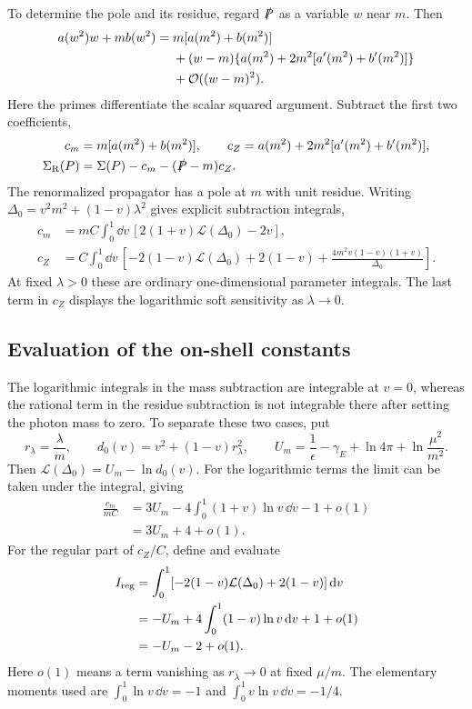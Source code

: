 To determine the pole and its residue, regard $\slashed P$ as a
variable $w$ near $m$. Then
\begin{equation}
 \begin{aligned}
 a(w^2)w+mb(w^2)={}&m[a(m^2)+b(m^2)]\\
 &+(w-m)\{a(m^2)+2m^2[a'(m^2)+b'(m^2)]\}\\
 &+\mathcal{O}((w-m)^2).
 \end{aligned}
\end{equation}
Here the primes differentiate the scalar squared argument. Subtract
the first two coefficients,
\begin{align}
 c_m&=m[a(m^2)+b(m^2)],\qquad
 c_Z=a(m^2)+2m^2[a'(m^2)+b'(m^2)],\\
 \Sigma_{\mathrm R}(P)&=\Sigma(P)-c_m-(\slashed P-m)c_Z.
\end{align}
The renormalized propagator has a pole at $m$ with unit residue.
Writing $\Delta_0=v^2m^2+(1-v)\lambda^2$ gives explicit subtraction
integrals,
\begin{align}
 c_m&=mC\int_0^1\dd v\,[2(1+v)\mathcal L(\Delta_0)-2v],\\
 c_Z&=C\int_0^1\dd v\,
 \left[-2(1-v)\mathcal L(\Delta_0)+2(1-v)
       +\frac{4m^2v(1-v)(1+v)}{\Delta_0}\right].
 \label{eq:comp-supp-cz}
\end{align}
At fixed $\lambda>0$ these are ordinary one-dimensional parameter
integrals. The last term in $c_Z$ displays the logarithmic soft
sensitivity as $\lambda\to0$.

\subsection{Evaluation of the on-shell constants}
The logarithmic integrals in the mass subtraction are integrable at
$v=0$, whereas the rational term in the residue subtraction is not
integrable there after setting the photon mass to zero. To separate
these two cases, put
\begin{equation}
 r_\lambda=\frac{\lambda}{m},\qquad
 d_0(v)=v^2+(1-v)r_\lambda^2,\qquad
 U_m=\frac1\epsilon-\gamma_E+\ln4\pi+\ln\frac{\mu^2}{m^2}.
\end{equation}
Then $\mathcal L(\Delta_0)=U_m-\ln d_0(v)$. For the logarithmic
terms the limit can be taken under the integral, giving
\begin{align}
 \frac{c_m}{mC}
 &=3U_m-4\int_0^1(1+v)\ln v\,\dd v-1+o(1)\\
 &=3U_m+4+o(1).
\end{align}
For the regular part of $c_Z/C$, define and evaluate
\begin{align}
 I_{\rm reg}&=\int_0^1[-2(1-v)\mathcal L(\Delta_0)+2(1-v)]\,\dd v\\
 &=-U_m+4\int_0^1(1-v)\ln v\,\dd v+1+o(1)\\
 &=-U_m-2+o(1).
\end{align}
Here $o(1)$ means a term vanishing as $r_\lambda\to0$ at fixed
$\mu/m$. The elementary moments used are
$\int_0^1\ln v\,\dd v=-1$ and
$\int_0^1v\ln v\,\dd v=-1/4$.

